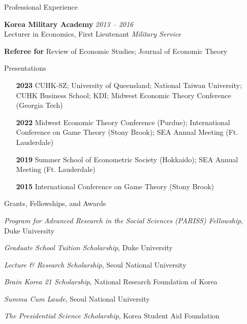
\begin{rSection}{Professional Experience}
	
	{\bf Korea Military Academy} \hfill {\em 2013 -- 2016} \\[5pt] 
	Lecturer in Economics, First Lieutenant \hfill {\em Military Service}
	
	\medskip 
	
	{\bf Referee for } Review of Economic Studies; Journal of Economic Theory
	
\end{rSection}
\medskip


\begin{rSection}{Presentations}
	
	\begin{itemize}
		\item [\textbf{2023}] CUHK-SZ; University of Queensland; National Taiwan University; CUHK Business School; KDI; Midwest Economic Theory Conference (Georgia Tech)
		\item [\textbf{2022}] Midwest Economic Theory Conference (Purdue); International Conference on Game Theory (Stony Brook); SEA Annual Meeting (Ft. Lauderdale)
		\item [\textbf{2019}] Summer School of Econometric Society (Hokkaido); SEA Annual Meeting (Ft. Lauderdale)
		\item [\textbf{2015}] International Conference on Game Theory (Stony Brook)
	\end{itemize}
	
	
\end{rSection}
\medskip

\begin{rSection}{Grants, Fellowships, and Awards}
	
	\begin{etaremune}
		
		\item \textit{Program for Advanced Research in the Social Sciences (PARISS) Fellowship}, Duke University 
		
		
		\item \textit{Graduate School Tuition Scholarship}, Duke University 
		\item \textit{Lecture \& Research Scholarship}, Seoul National University 
		\item \textit{Brain Korea 21 Scholarship}, National Research Foundation of Korea 
		\item \textit{Summa Cum Laude}, Seoul National University 
		\item  \textit{The Presidential Science Scholarship}, Korea Student Aid Foundation 
	\end{etaremune}
	
	
\end{rSection}
\medskip

